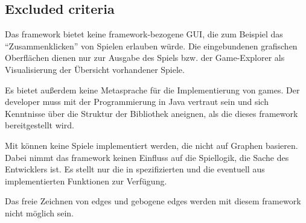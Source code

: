 \subsection{Excluded criteria}
Das {\graphioli} framework bietet keine framework-bezogene GUI, die zum Beispiel das ``Zusammenklicken'' von Spielen erlauben würde. Die eingebundenen grafischen Oberflächen dienen nur zur Ausgabe des Spiels bzw. der Game-Explorer als Visualisierung der Übersicht vorhandener Spiele.\par
Es bietet außerdem keine Metasprache für die Implementierung von games. Der developer muss mit der Programmierung in Java vertraut sein und sich Kenntnisse über die Struktur der Bibliothek aneignen, als die dieses framework bereitgestellt wird.\par
Mit {\graphioli} können keine Spiele implementiert werden, die nicht auf Graphen basieren. Dabei nimmt das framework keinen Einfluss auf die Spiellogik, die Sache des Entwicklers ist. Es stellt nur die in  spezifizierten und die eventuell aus  implementierten Funktionen zur Verfügung.\par
Das freie Zeichnen von edges und gebogene edges werden mit diesem framework nicht möglich sein.\par
{}
